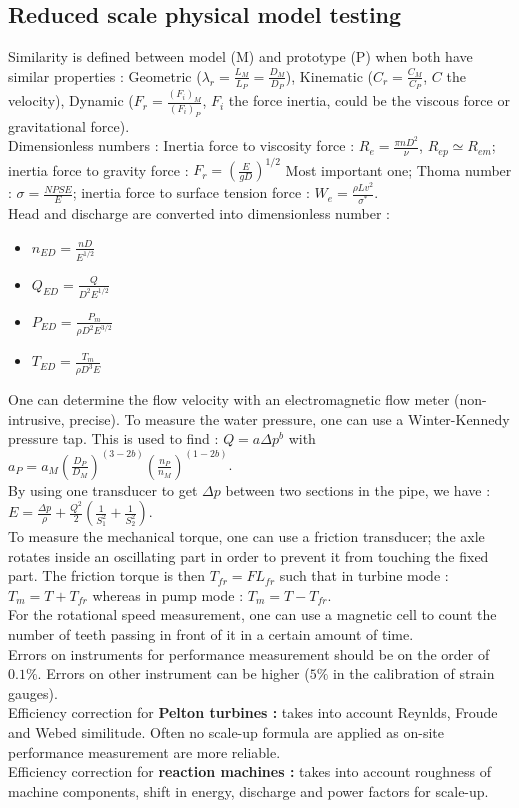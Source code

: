 \documentclass[../main.tex]{subfiles}
\begin{document}
\subsection{Reduced scale physical model testing}

Similarity is defined between model (M) and prototype (P) when both have similar properties : Geometric ($\lambda_r = \frac{L_M}{L_P} = \frac{D_M}{D_P}$), Kinematic ($C_r = \frac{C_M}{C_P}$, $C$ the velocity), Dynamic ($F_r = \frac{(F_i)_M}{(F_i)_P}$, $F_i$ the force inertia, could be the viscous force or gravitational force).\\
Dimensionless numbers : Inertia force to viscosity force : $R_e = \frac{\pi n D^2}{\nu}$, $R_{ep} \simeq R_{em}$; inertia force to gravity force : $F_r = (\frac{E}{gD})^{1/2}$ \warning Most important one; Thoma number : $\sigma = \frac{NPSE}{E}$; inertia force to surface tension force : $W_e = \frac{\rho L v^2}{\sigma^*}$.\\
Head and discharge are converted into dimensionless number : \begin{itemize}
    \item $n_{ED} = \frac{nD}{E^{1/2}}$
    \item $Q_{ED} = \frac{Q}{D^2 E^{1/2}}$
    \item $P_{ED} = \frac{P_m}{\rho D^2 E^{3/2}}$
    \item $T_{ED} = \frac{T_m}{\rho D^3 E}$
\end{itemize}
One can determine the flow velocity with an electromagnetic flow meter (non-intrusive, precise). To measure the water pressure, one can use a Winter-Kennedy pressure tap. This is used to find : $Q = a \Delta p^b$ with $a_P = a_M (\frac{D_P}{D_M})^{(3-2b)} (\frac{n_P}{n_M})^{(1-2b)}$.\\
By using one transducer to get $\Delta p$ between two sections in the pipe, we have : $E = \frac{\Delta p}{\rho} + \frac{Q^2}{2} (\frac{1}{S_1^2}+\frac{1}{S_2^2})$.\\
To measure the mechanical torque, one can use a friction transducer; the axle rotates inside an oscillating part in order to prevent it from touching the fixed part. The friction torque is then $T_{fr} = FL_{fr}$ such that in turbine mode : $T_m = T + T_{fr}$ whereas in pump mode : $T_m = T-T_{fr}$.\\
For the rotational speed measurement, one can use a magnetic cell to count the number of teeth passing in front of it in a certain amount of time.\\
Errors on instruments for performance measurement should be on the order of $0.1\%$. Errors on other instrument can be higher ($5\%$ in the calibration of strain gauges). \\
Efficiency correction for \textbf{Pelton turbines :} takes into account Reynlds, Froude and Webed similitude. Often no scale-up formula are applied as on-site performance measurement are more reliable. \\
Efficiency correction for \textbf{reaction machines :} takes into account roughness of machine components, shift in energy, discharge and power factors for scale-up.\\
\end{document}
